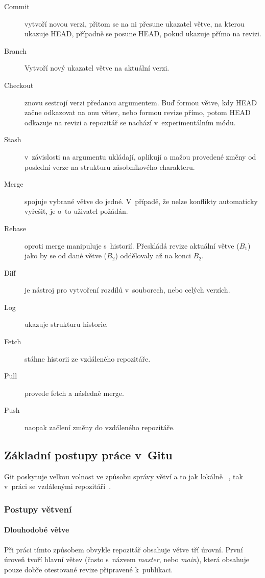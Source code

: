 \documentclass[
  biblatex,
  glossaries,
  index
]{kidiplom}
\begin{document}
\begin{description}
  \item[Commit]  vytvoří novou verzi, přitom se na ni přesune ukazatel větve, na kterou ukazuje HEAD, případně se posune HEAD, pokud ukazuje přímo na revizi.
  \item[Branch] Vytvoří nový ukazatel větve na aktuální verzi.
  \item[Checkout] znovu sestrojí verzi předanou argumentem. Buď formou větve, kdy HEAD začne odkazovat na onu větev, nebo formou revize přímo, potom HEAD odkazuje na revizi a repozitář se nachází v~experimentálním módu.
  \item[Stash] v~závislosti na argumentu ukládají, aplikují a mažou provedené změny od poslední verze na strukturu zásobníkového charakteru.
  \item[Merge] spojuje vybrané větve do jedné. V~případě, že nelze konflikty automaticky vyřešit, je o~to uživatel požádán.
  \item[Rebase] oproti merge manipuluje s~historií. Přeskládá revize aktuální větve ($B_1$) jako by se od dané větve ($B_2$) oddělovaly až na konci $B_2$.
  \item[Diff] je nástroj pro vytvoření rozdílů v~souborech, nebo celých verzích.
  \item[Log] ukazuje strukturu historie.
  \item[Fetch] stáhne historii ze vzdáleného repozitáře.
  \item[Pull] provede fetch a následně merge.
  \item[Push] naopak začlení změny do vzdáleného repozitáře.
\end{description}

\subsection{Základní postupy práce v~Gitu}
Git poskytuje velkou volnost ve způsobu správy větví a to jak lokálně~\cite{gitreference-local} , tak v~práci se vzdálenými repozitáři~\cite{gitreference-distributed}.

\subsubsection{Postupy větvení}
\paragraph*{Dlouhodobé větve}
Při práci tímto způsobem obvykle repozitář obsahuje větve tří úrovní. První úroveň tvoří hlavní větev (často s~názvem {\it master}, nebo {\it main}), která obsahuje pouze dobře otestované revize připravené k~publikaci.
\end{document}
